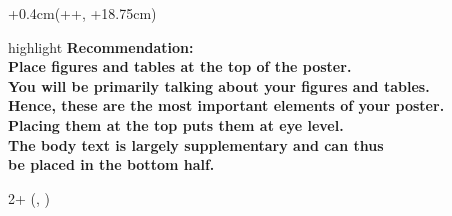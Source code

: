 \documentclass{beamer}
\newlength{\blockOne}
\newlength{\blockTwo}
\begin{document}
\begin{frame}[t]
\TPshowboxesfalse
\begin{textblock*}{\colwidth+0.4cm}(\leftmargin+\colwidth+\colsep-0.2cm, \blockOne+18.75cm)
	\begin{beamercolorbox}[sep = 25pt, center]{highlight}
		\sffamily\bfseries\small%
		Recommendation: \\
		Place figures and tables at the top of the poster. \\[\medskipamount]
		\mdseries
		You will be primarily talking about your figures and tables. \\
		Hence, these are the most important elements of your poster. \\
		Placing them at the top puts them at eye level. \\
		The body text is largely supplementary and can thus \\
		be placed in the bottom half.
	\end{beamercolorbox}
\end{textblock*}
\TPshowboxestrue




\begin{textblock*}{2\colwidth + \colsep}(\leftmargin, \blockTwo)


\end{textblock*}
\end{frame}
\end{document}
